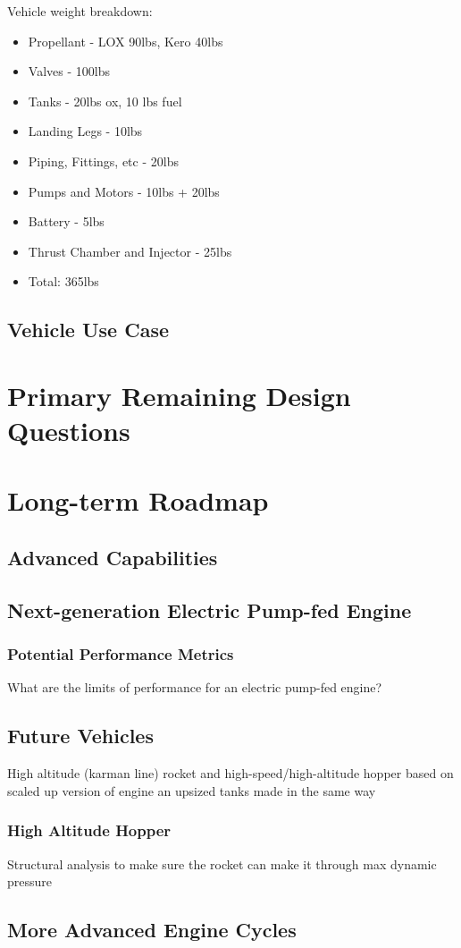 \documentclass[12pt, letterpaper]{article}
\begin{document}
Vehicle weight breakdown:\par
\begin{itemize}
    \item Propellant - LOX 90lbs, Kero 40lbs
    \item Valves - 100lbs
    \item Tanks - 20lbs ox, 10 lbs fuel
    \item Landing Legs - 10lbs
    \item Piping, Fittings, etc - 20lbs
    \item Pumps and Motors - 10lbs + 20lbs
    \item Battery - 5lbs
    \item Thrust Chamber and Injector - 25lbs
    \item Total: 365lbs
\end{itemize}

\subsection{Vehicle Use Case}

\section{Primary Remaining Design Questions}

\section{Long-term Roadmap}
\subsection{Advanced Capabilities}
\subsection{Next-generation Electric Pump-fed Engine}
\subsubsection{Potential Performance Metrics}
What are the limits of performance for an electric pump-fed engine?

\subsection{Future Vehicles}
High altitude (karman line) rocket and high-speed/high-altitude hopper based on scaled up version of engine an upsized tanks made in the same way

\subsubsection{High Altitude Hopper}
Structural analysis to make sure the rocket can make it through max dynamic pressure
\subsection{More Advanced Engine Cycles}
\end{document}
